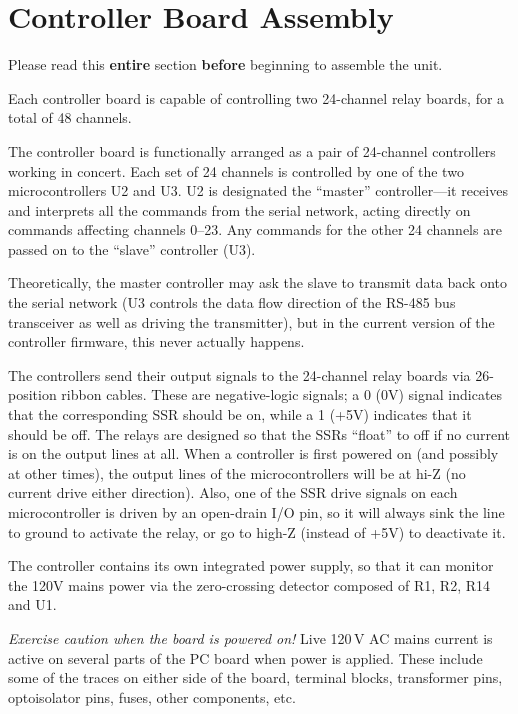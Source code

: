 \documentclass[12pt]{article}
\begin{document}
\section{Controller Board Assembly}
Please read this {\bf entire} section {\bf before} beginning to assemble
the unit.

Each controller board is capable of controlling two 24-channel relay
boards, for a total of 48 channels.

The controller board is functionally arranged as a pair of 24-channel
controllers working in concert.  Each set of 24 channels is controlled
by one of the two microcontrollers U2 and U3.  U2 is designated the
``master'' controller---it receives and interprets all the commands
from the serial network, acting directly on commands affecting channels
0--23.  Any commands for the other 24 channels are passed on to the
``slave'' controller (U3).

Theoretically, the master controller may ask the slave to transmit
data back onto the serial network (U3 controls the data flow direction
of the RS-485 bus transceiver as well as driving the transmitter), but
in the current version of the controller firmware, this never actually
happens.  

The controllers send their output signals to the 24-channel relay boards
via 26-position ribbon cables.  These are negative-logic signals; a 0 (0V)
signal indicates that the corresponding SSR should be on, while a 1 (+5V) 
indicates that it should be off.  The relays are designed so that the SSRs
``float'' to off if no current is on the output lines at all.  When a 
controller is first powered on (and possibly at other times), the output lines
of the microcontrollers will be at hi-Z (no current drive either direction).
Also, one of the SSR drive signals on each microcontroller is driven by an
open-drain I/O pin, so it will always sink the line to ground to activate the
relay, or go to high-Z (instead of +5V) to deactivate it.

The controller contains its own integrated power supply, so that it can
monitor the 120V mains power via the zero-crossing detector composed of
R1, R2, R14 and U1.

\emph{Exercise caution when the board is powered on!}  Live 120\,V AC mains 
current is active on several parts of the PC board when power is
applied.  These include some of the traces on either side of the
board, terminal blocks, transformer pins, optoisolator pins, fuses, 
other components, etc.
\end{document}
